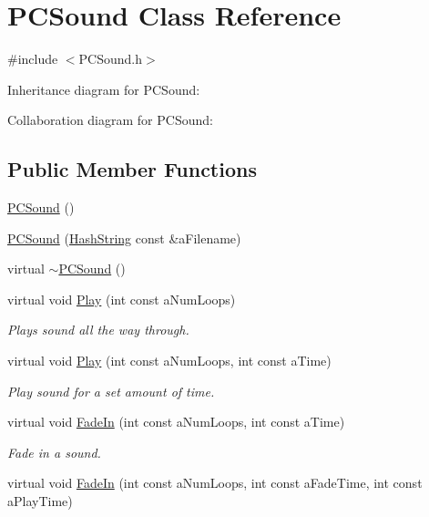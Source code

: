\hypertarget{classPCSound}{}\section{P\+C\+Sound Class Reference}
\label{classPCSound}


{\ttfamily \#include $<$P\+C\+Sound.\+h$>$}



Inheritance diagram for P\+C\+Sound\+:


Collaboration diagram for P\+C\+Sound\+:
\subsection*{Public Member Functions}
\begin{DoxyCompactItemize}
\item 
\hyperlink{classPCSound_aec80bc46b433182ba59600aa5412d21d}{P\+C\+Sound} ()
\item 
\hyperlink{classPCSound_a4468ad0fdfaa965542d56016ab0d6784}{P\+C\+Sound} (\hyperlink{classHashString}{Hash\+String} const \&a\+Filename)
\item 
virtual \hyperlink{classPCSound_a1b42285b7c5611925e3462234a3dabd1}{$\sim$\+P\+C\+Sound} ()
\item 
virtual void \hyperlink{classPCSound_a0c41046ec72c3b0e45c25afee8f2587b}{Play} (int const a\+Num\+Loops)
\begin{DoxyCompactList}\small\item\em Plays sound all the way through. \end{DoxyCompactList}\item 
virtual void \hyperlink{classPCSound_a3c5e2bb0f92fe66f0f16c3faacb3e5fe}{Play} (int const a\+Num\+Loops, int const a\+Time)
\begin{DoxyCompactList}\small\item\em Play sound for a set amount of time. \end{DoxyCompactList}\item 
virtual void \hyperlink{classPCSound_a2cdcbe269162e7ff0acaa471f07ceec6}{Fade\+In} (int const a\+Num\+Loops, int const a\+Time)
\begin{DoxyCompactList}\small\item\em Fade in a sound. \end{DoxyCompactList}\item 
virtual void \hyperlink{classPCSound_a65cc536a88f6b49ffd4ab6c2c85bd38b}{Fade\+In} (int const a\+Num\+Loops, int const a\+Fade\+Time, int const a\+Play\+Time)

\end{DoxyCompactItemize}
